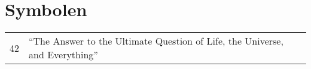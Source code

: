 \documentclass[master=elt,masteroption=eg]{kulemt}
\begin{document}
\section*{Symbolen}
\begin{flushleft}
  \renewcommand{\arraystretch}{1.1}
  \begin{tabularx}{\textwidth}{@{}p{12mm}X@{}}
    42    & ``The Answer to the Ultimate Question of Life, the Universe,
            and Everything''\\
  \end{tabularx}
\end{flushleft}

\mainmatter










\appendixpage*          %
\appendix


\backmatter


\end{document}
